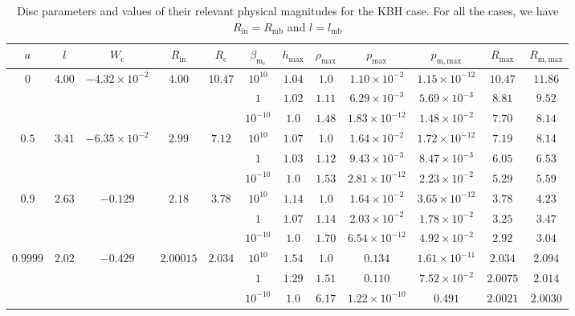 \documentclass[twocolumn,aps,showpacs,showkeys,prd,superscriptaddress,byrevtex, amsmath]{revtex4-1}
\begin{document}
\begin{table}
\caption{Disc parameters and values of their relevant physical magnitudes for the KBH case. For all the cases, we have $R_{\mathrm{in}} = R_{\mathrm{mb}}$ and $l = l_{\mathrm{mb}}$}        
\label{HBH_disk_parameters}      
\centering          
\begin{tabular}{c c c c c  c c c c c c c}
\hline\hline       
 $a$ & $l$ & $W_{\mathrm{c}}$ & $R_{\mathrm{in}}$ & $R_{\mathrm{c}}$ &  $\beta_{\mathrm{m_{\mathrm{c}}}}$ & $h_{\mathrm{max}}$ & $\rho_{\mathrm{max}}$ & $p_{\mathrm{max}}$ & $p_{\mathrm{m, max}}$ & $R_{\mathrm{max}}$ & $R_{\mathrm{m, max}}$\\ 
\hline           
$0$ & $4.00$ & $-4.32 \times 10^{-2}$ & $4.00$ & $10.47$ & $10^{10}$ & $1.04$ & $1.0$ & $1.10 \times 10^{-2}$ & $1.15 \times 10^{-12}$ & $10.47$ & $11.86$\\ 
 \hline 
 &  &  &  &  & $1$ & $1.02$ & $1.11$ & $6.29 \times 10^{-3}$ & $5.69 \times 10^{-3}$ & $8.81$ & $9.52$\\ 
 \hline 
 &  &  &  &  & $10^{-10}$ & $1.0$ & $1.48$ & $1.83 \times 10^{-12}$ & $1.48 \times 10^{-2}$ & $7.70$ & $8.14$\\ 
 \hline 
 $0.5$ & $3.41$ & $-6.35 \times 10^{-2}$ & $2.99$ & $7.12$ & $10^{10}$ & $1.07$ & $1.0$ & $1.64 \times 10^{-2}$ & $1.72 \times 10^{-12}$ & $7.19$ & $8.14$\\ 
 \hline 
 &  &  &  &  & $1$ & $1.03$ & $1.12$ & $9.43 \times 10^{-3}$ & $8.47 \times 10^{-3}$ & $6.05$ & $6.53$ \\ 
 \hline 
 &  &  &  &  & $10^{-10}$ & $1.0$ & $1.53$ & $2.81 \times 10^{-12}$ & $2.23 \times 10^{-2}$ & $5.29$ & $5.59$\\ 
\hline  
$0.9$ & $2.63$ & $-0.129$ & $2.18$ & $3.78$ & $10^{10}$ & $1.14$ & $1.0$ & $1.64 \times 10^{-2}$ & $3.65 \times 10^{-12}$ & $3.78$ & $4.23$\\ 
 \hline 
 &  &  &  &  & $1$ & $1.07$ & $1.14$ & $2.03 \times 10^{-2}$ & $1.78 \times 10^{-2}$ & $3.25$ & $3.47$\\ 
 \hline 
 &  &  &  &  & $10^{-10}$ & $1.0$ & $1.70$ & $6.54 \times 10^{-12}$ & $4.92 \times 10^{-2}$ & $2.92$ & $3.04$ \\ 
 \hline 
$0.9999$ & $2.02$ & $-0.429$ & $2.00015$ & $2.034$ & $10^{10}$ & $1.54$ & $1.0$ & $0.134$ & $1.61 \times 10^{-11}$ & $2.034$ & $2.094$ \\ 
\hline 
 &  &  &  &  & $1$ & $1.29$ & $1.51$ & $0.110$ & $7.52 \times 10^{-2}$ & $2.0075$ & $2.014$\\ 
\hline 
 &  &  &  &  & $10^{-10}$ & $1.0$ & $6.17$ & $1.22 \times 10^{-10}$ & $0.491$ & $2.0021$ & $2.0030$ \\ 
\hline   
\end{tabular}
\end{table}
\end{document}
